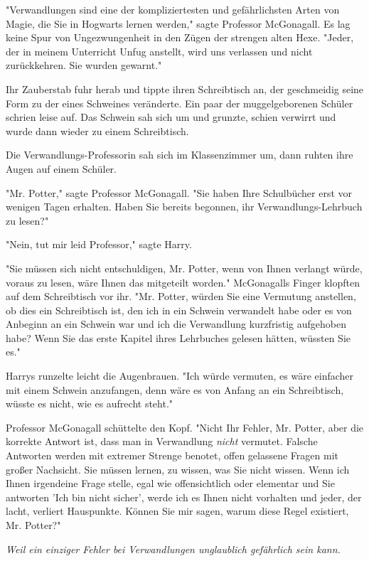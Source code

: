 {\later

"Verwandlungen sind eine der kompliziertesten und gefährlichsten Arten von Magie, die Sie in Hogwarts lernen werden," sagte Professor McGonagall. Es lag keine Spur von Ungezwungenheit in den Zügen der strengen alten Hexe. "Jeder, der in meinem Unterricht Unfug anstellt, wird uns verlassen und nicht zurückkehren. Sie wurden gewarnt."

Ihr Zauberstab fuhr herab und tippte ihren Schreibtisch an, der geschmeidig seine Form zu der eines Schweines veränderte. Ein paar der muggelgeborenen Schüler schrien leise auf. Das Schwein sah sich um und grunzte, schien verwirrt und wurde dann wieder zu einem Schreibtisch.

Die Verwandlungs-Professorin sah sich im Klassenzimmer um, dann ruhten ihre Augen auf einem Schüler.

"Mr. Potter," sagte Professor McGonagall. "Sie haben Ihre Schulbücher erst vor wenigen Tagen erhalten. Haben Sie bereits begonnen, ihr Verwandlungs-Lehrbuch zu lesen?"

"Nein, tut mir leid Professor," sagte Harry.

"Sie müssen sich nicht entschuldigen, Mr. Potter, wenn von Ihnen verlangt würde, voraus zu lesen, wäre Ihnen das mitgeteilt worden." McGonagalls Finger klopften auf dem Schreibtisch vor ihr. "Mr. Potter, würden Sie eine Vermutung anstellen, ob dies ein Schreibtisch ist, den ich in ein Schwein verwandelt habe oder es von Anbeginn an ein Schwein war und ich die Verwandlung kurzfristig aufgehoben habe? Wenn Sie das erste Kapitel ihres Lehrbuches gelesen hätten, wüssten Sie es."

Harrys runzelte leicht die Augenbrauen. "Ich würde vermuten, es wäre einfacher mit einem Schwein anzufangen, denn wäre es von Anfang an ein Schreibtisch, wüsste es nicht, wie es aufrecht steht."

Professor McGonagall schüttelte den Kopf. "Nicht Ihr Fehler, Mr. Potter, aber die korrekte Antwort ist, dass man in Verwandlung \emph{nicht} vermutet. Falsche Antworten werden mit extremer Strenge benotet, offen gelassene Fragen mit großer Nachsicht. Sie müssen lernen, zu wissen, was Sie nicht wissen. Wenn ich Ihnen irgendeine Frage stelle, egal wie offensichtlich oder elementar und Sie antworten 'Ich bin nicht sicher', werde ich es Ihnen nicht vorhalten und jeder, der lacht, verliert Hauspunkte. Können Sie mir sagen, warum diese Regel existiert, Mr. Potter?"

\emph{Weil ein einziger Fehler bei Verwandlungen unglaublich gefährlich sein kann.}

}
